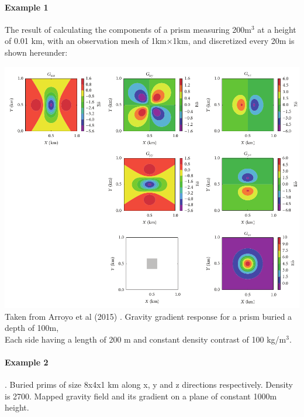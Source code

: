 \newpage
\paragraph{Example 1}
The result of calculating
the components of a prism measuring 200m$^3$ at a height of 0.01 km, 
with an observation mesh of 1km$\times$1km, and discretized every 20m is shown hereunder:
\begin{center}
\includegraphics[width=14cm]{images/gravity/arct15b}\\
{\captionfont Taken from Arroyo et al (2015) \cite{arct15}. 
Gravity gradient response for a prism buried a depth of 100m,\\ 
Each side having a length of 200 m and constant density contrast 
of 100 kg/m$^3$.}
\end{center}


\newpage
\paragraph{Example 2}. Buried prims of size 8x4x1 km along x, y and z directions respectively. 
Density is 2700. Mapped gravity field and its gradient on a plane of constant 1000m height.

